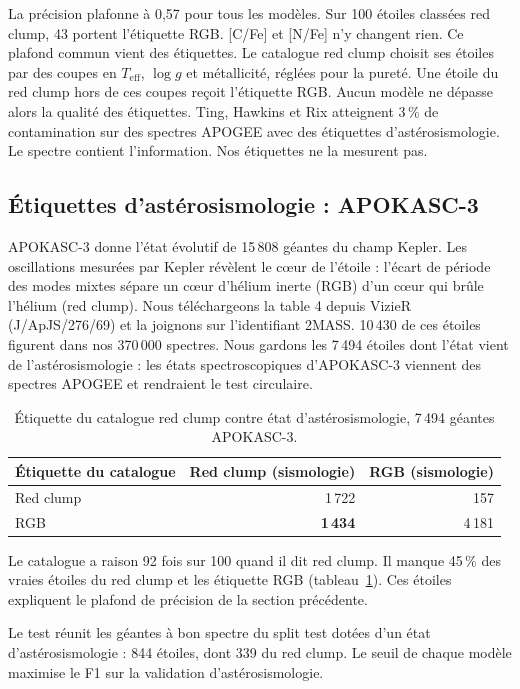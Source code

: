 \documentclass[11pt,a4paper]{article}
\newcommand{\teff}{$T_{\mathrm{eff}}$}
\begin{document}
La précision plafonne à 0,57 pour tous les modèles. Sur 100 étoiles classées red clump, 43 portent l'étiquette RGB. [C/Fe] et [N/Fe] n'y changent rien. Ce plafond commun vient des étiquettes. Le catalogue red clump \cite{bovy2014} choisit ses étoiles par des coupes en \teff{}, $\log g$ et métallicité, réglées pour la pureté. Une étoile du red clump hors de ces coupes reçoit l'étiquette RGB. Aucun modèle ne dépasse alors la qualité des étiquettes. Ting, Hawkins et Rix \cite{ting2018} atteignent 3\,\% de contamination sur des spectres APOGEE avec des étiquettes d'astérosismologie. Le spectre contient l'information. Nos étiquettes ne la mesurent pas.

\subsection{Étiquettes d'astérosismologie : APOKASC-3}

APOKASC-3 \cite{pinsonneault2025} donne l'état évolutif de 15\,808 géantes du champ Kepler. Les oscillations mesurées par Kepler révèlent le cœur de l'étoile : l'écart de période des modes mixtes sépare un cœur d'hélium inerte (RGB) d'un cœur qui brûle l'hélium (red clump). Nous téléchargeons la table 4 depuis VizieR (J/ApJS/276/69) et la joignons sur l'identifiant 2MASS. 10\,430 de ces étoiles figurent dans nos 370\,000 spectres. Nous gardons les 7\,494 étoiles dont l'état vient de l'astérosismologie : les états spectroscopiques d'APOKASC-3 viennent des spectres APOGEE et rendraient le test circulaire.

\begin{table}[H]
\centering
\caption{Étiquette du catalogue red clump contre état d'astérosismologie, 7\,494 géantes APOKASC-3.}
\label{tab:apokasc_cross}
\begin{tabular}{lrr}
\toprule
Étiquette du catalogue & Red clump (sismologie) & RGB (sismologie) \\
\midrule
Red clump & 1\,722 & 157 \\
RGB & \textbf{1\,434} & 4\,181 \\
\bottomrule
\end{tabular}
\end{table}

Le catalogue a raison 92 fois sur 100 quand il dit red clump. Il manque 45\,\% des vraies étoiles du red clump et les étiquette RGB (tableau~\ref{tab:apokasc_cross}). Ces étoiles expliquent le plafond de précision de la section précédente.

Le test réunit les géantes à bon spectre du split test dotées d'un état d'astérosismologie : 844 étoiles, dont 339 du red clump. Le seuil de chaque modèle maximise le F1 sur la validation d'astérosismologie.
\end{document}
